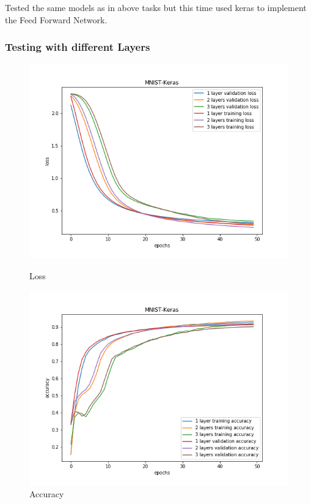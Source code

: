 \documentclass{article}
\begin{document}
Tested the same models as in above tasks but this time used keras to implement the Feed Forward Network.

\subsubsection{Testing with different Layers}

\begin{figure}[!htb]
	\includegraphics[width=\linewidth]{../output_plots/part_1_task_4_layers_loss.png}
	\caption{Loss}\label{fig:part_1_task_4_layers_loss}
	\endminipage\hfill
	\includegraphics[width=\linewidth]{../output_plots/part_1_task_4_layers_accuracy.png}
	\caption{Accuracy}\label{fig:part_1_task_4_layers_accuracy}
	\endminipage\hfill
\end{figure}
\end{document}
